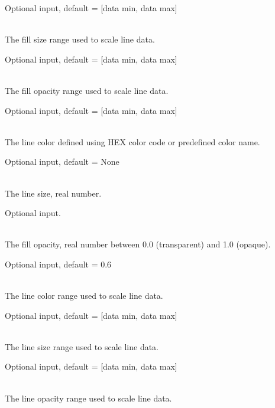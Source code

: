 \begin{description}[topsep=0pt,parsep=0.5em,itemsep=-0.4em]
\begin{description}[topsep=0pt,parsep=0.5em,itemsep=-0.4em]
\begin{description}[topsep=0pt,parsep=0.5em,itemsep=-0.4em]
\begin{description}[topsep=0pt,parsep=0.5em,itemsep=-0.4em]
                Optional input, default = [data min, data max]
        \item[{size range}]\hfill
\\The fill size range used to scale line data.
                
                Optional input, default = [data min, data max]
        \item[{opacity range}]\hfill
\\The fill opacity range used to scale line data.
                
                Optional input, default = [data min, data max]
      \end{description}
      \item[{line}]\hfill
      \begin{description}[topsep=0pt,parsep=0.5em,itemsep=-0.4em]
        \item[{color}]\hfill
\\The line color defined using HEX color code or predefined color name.
                
                Optional input, default = None
        \item[{size}]\hfill
\\The line size, real number.
                
                Optional input.
        \item[{opacity}]\hfill
\\The fill opacity, real number between 0.0 (transparent) and 1.0 (opaque).
                
                Optional input, default = 0.6
        \item[{color range}]\hfill
\\The line color range used to scale line data.
                
                Optional input, default = [data min, data max]
        \item[{size range}]\hfill
\\The line size range used to scale line data.
                
                Optional input, default = [data min, data max]
        \item[{opacity range}]\hfill
\\The line opacity range used to scale line data.
                

\end{description}
\end{description}
\end{description}
\end{description}
